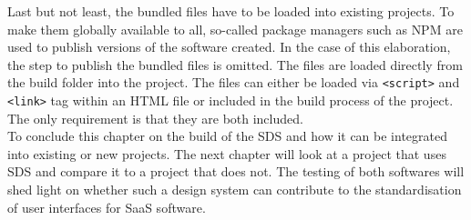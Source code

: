 Last but not least, the bundled files have to be loaded into existing projects. To make them globally available to all, so-called package managers such as \ac{NPM} are used to publish versions of the software created. In the case of this elaboration, the step to publish the bundled files is omitted. The files are loaded directly from the build folder into the project. The files can either be loaded via \texttt{<script>} and \texttt{<link>} tag within an \ac{HTML} file or included in the build process of the project. The only requirement is that they are both included. \\
To conclude this chapter on the build of the \ac{SDS} and how it can be integrated into existing or new projects. The next chapter will look at a project that uses \ac{SDS} and compare it to a project that does not. The testing of both softwares will shed light on whether such a design system can contribute to the standardisation of user interfaces for \ac{SaaS} software. 
